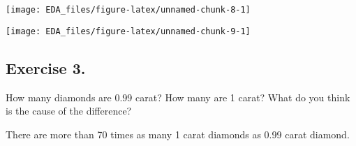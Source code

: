 \documentclass[]{book}
\newenvironment{Shaded}{\begin{snugshade}}{\end{snugshade}}
\newcommand{\CommentTok}[1]{\textcolor[rgb]{0.56,0.35,0.01}{\textit{#1}}}
\newcommand{\DataTypeTok}[1]{\textcolor[rgb]{0.13,0.29,0.53}{#1}}
\newcommand{\DecValTok}[1]{\textcolor[rgb]{0.00,0.00,0.81}{#1}}
\newcommand{\FloatTok}[1]{\textcolor[rgb]{0.00,0.00,0.81}{#1}}
\newcommand{\KeywordTok}[1]{\textcolor[rgb]{0.13,0.29,0.53}{\textbf{#1}}}
\newcommand{\NormalTok}[1]{#1}
\newcommand{\OperatorTok}[1]{\textcolor[rgb]{0.81,0.36,0.00}{\textbf{#1}}}
\newcommand{\StringTok}[1]{\textcolor[rgb]{0.31,0.60,0.02}{#1}}
\theoremstyle{definition}
\theoremstyle{definition}
\theoremstyle{definition}
\theoremstyle{remark}
\begin{document}
\begin{center}\texttt{[image: EDA\_files/figure-latex/unnamed-chunk-8-1]} \end{center}

\begin{Shaded}
\end{Shaded}

\begin{center}\texttt{[image: EDA\_files/figure-latex/unnamed-chunk-9-1]} \end{center}

\hypertarget{exercise-3.-7}{%
\subsection{Exercise 3.}\label{exercise-3.-7}}

How many diamonds are 0.99 carat? How many are 1 carat? What do you
think is the cause of the difference?

There are more than 70 times as many 1 carat diamonds as 0.99 carat
diamond.

\begin{Shaded}
\end{Shaded}
\end{document}
